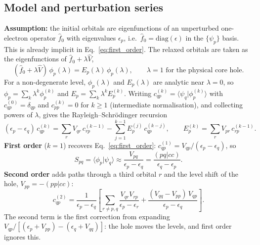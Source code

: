 \documentclass[11pt]{article}
\begin{document}
\subsection*{Model and perturbation series}

\textbf{Assumption:} the initial orbitals are eigenfunctions of an unperturbed one-electron operator $\hat f_0$ with eigenvalues $\epsilon_p$, i.e.\ $\hat f_0 = \mathrm{diag}(\epsilon)$ in the $\{\psi_p\}$ basis. This is already implicit in Eq.~\eqref{eq:first_order}. The relaxed orbitals are taken as the eigenfunctions of $\hat f_0 + \lambda \hat V$,
\begin{equation}
  (\hat f_0 + \lambda \hat V)\,\phi_p(\lambda) = E_p(\lambda)\,\phi_p(\lambda),
  \qquad \lambda = 1 \text{ for the physical core hole.}
\end{equation}
For a non-degenerate level, $\phi_p(\lambda)$ and $E_p(\lambda)$ are analytic near $\lambda=0$, so $\phi_p = \sum_k \lambda^k \phi_p^{(k)}$ and $E_p = \sum_k \lambda^k E_p^{(k)}$. Writing $c^{(k)}_{qp} = \langle\psi_q|\phi_p^{(k)}\rangle$ with $c^{(0)}_{qp} = \delta_{qp}$ and $c^{(k)}_{pp} = 0$ for $k\geq1$ (intermediate normalisation), and collecting powers of $\lambda$, gives the Rayleigh--Schr\"odinger recursion
\begin{equation}
  (\epsilon_p - \epsilon_q)\, c^{(k)}_{qp} = \sum_r V_{qr}\, c^{(k-1)}_{rp} - \sum_{j=1}^{k-1} E_p^{(j)}\, c^{(k-j)}_{qp},
  \qquad E_p^{(k)} = \sum_r V_{pr}\, c^{(k-1)}_{rp}.
\end{equation}
\textbf{First order} ($k=1$) recovers Eq.~\eqref{eq:first_order}: $c^{(1)}_{qp} = V_{qp}/(\epsilon_p-\epsilon_q)$, so
\begin{equation}
  S_{pq} = \langle\phi_p|\psi_q\rangle \approx \frac{V_{pq}}{\epsilon_p-\epsilon_q} = \frac{(pq|cc)}{\epsilon_q-\epsilon_p}.
\end{equation}
\textbf{Second order} adds paths through a third orbital $r$ and the level shift of the hole, $V_{pp} = -(pp|cc)$:
\begin{equation}
  c^{(2)}_{qp} = \frac{1}{\epsilon_p-\epsilon_q}\left[\sum_{r\neq p,q}\frac{V_{qr}V_{rp}}{\epsilon_p-\epsilon_r}
  + \frac{(V_{qq}-V_{pp})\,V_{qp}}{\epsilon_p-\epsilon_q}\right].
\end{equation}
The second term is the first correction from expanding $V_{qp}/[(\epsilon_p+V_{pp})-(\epsilon_q+V_{qq})]$: the hole moves the levels, and first order ignores this.
\end{document}
